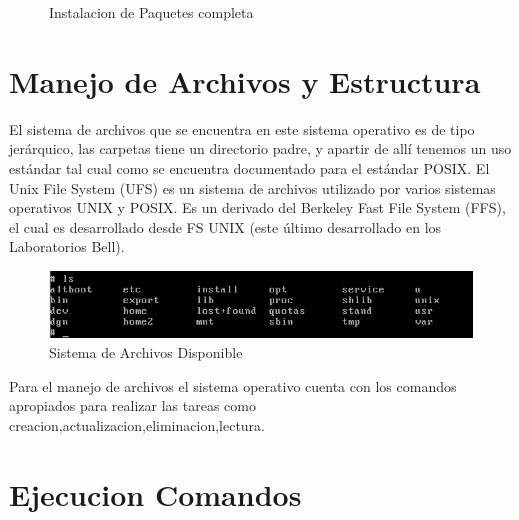 \documentclass[paper=a4, fontsize=12pt]{article}        %
\numberwithin{equation}{section}                        %
\numberwithin{table}{section}                           %
\begin{document}
\begin{figure}[H]
{{        }}
        \hfill
    \caption{Instalacion de Paquetes completa}
\end{figure}


\section{Manejo de Archivos y Estructura}
El sistema de archivos que se encuentra en este sistema operativo es de tipo jerárquico, las carpetas tiene un directorio padre, y apartir de allí tenemos un uso estándar tal cual como se encuentra documentado para el estándar POSIX. 
El Unix File System (UFS) es un sistema de archivos utilizado por varios sistemas operativos UNIX y POSIX. Es un derivado del Berkeley Fast File System (FFS), el cual es desarrollado desde FS UNIX (este último desarrollado en los Laboratorios Bell). 
\begin{center}
\begin{figure}[H]
\includegraphics[scale=0.6]{img/directorios.png}
\caption{Sistema de Archivos Disponible}
\label{fig:dis2}
\end{figure}
\end{center}
Para el manejo de archivos el sistema operativo cuenta con los comandos apropiados para realizar las tareas como creacion,actualizacion,eliminacion,lectura.

\section{Ejecucion Comandos}
\end{document}
